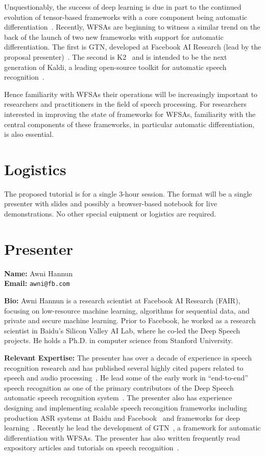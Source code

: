 \documentclass[11pt]{article}
\begin{document}
Unquestionably, the success of deep learning is due in part to the continued
evolution of tensor-based frameworks with a core component being automatic
differentiation~\cite{paszke2019pytorch, collobert2011torch7,
abadi2016tensorflow}. Recently, WFSAs are beginning to witness a similar trend
on the back of the launch of two new frameworks with support for automatic
differentiation. The first is GTN, developed at Facebook AI Research (lead by
the proposal presenter)~\cite{gtn}. The second is K2~\cite{k2} and is intended
to be the next generation of Kaldi, a leading open-source toolkit for automatic
speech recognition~\cite{povey2011kaldi}.

Hence familiarity with WFSAs their operations will be increasingly important to
researchers and practitioners in the field of speech processing. For
researchers interested in improving the state of frameworks for WFSAs,
familiarity with the central components of these frameworks, in particular
automatic differentiation, is also essential.

\section*{Logistics}

The proposed tutorial is for a single 3-hour session. The format will be a
single presenter with slides and possibly a browser-based notebook for live
demonstrations. No other special euipment or logistics are required.

\section*{Presenter}

{\bf Name:} Awni Hannun \\
{\bf Email:} \texttt{awni@fb.com}

{\bf Bio:} Awni Hannun is a research scientist at Facebook AI Research (FAIR),
focusing on low-resource machine learning, algorithms for sequential data, and
private and secure machine learning. Prior to Facebook, he worked as a research
scientist in Baidu's Silicon Valley AI Lab, where he co-led the Deep Speech
projects. He holds a Ph.D. in computer science from Stanford University.

{\bf Relevant Expertise:}
The presenter has over a decade of experience in speech recognition research
and has published several highly cited papers related to speech and audio
processing~\cite{hannun2014deep, maas2013, amodei2016deep}. He lead some of the
early work in ``end-to-end'' speech recognition as one of the primary
contributors of the Deep Speech automatic speech recognition
system~\cite{hannun2014deep}. The presenter also has experience designing and
implementing scalable speech recongition frameworks including production ASR
systems at Baidu and Facebook~\cite{amodei2016deep, w2lcode, pratap2019} and
frameworks for deep learning~\cite{flashlight}. Recently he lead the
development of GTN~\cite{gtn, hannun2020differentiable}, a framework for
automatic differentiation with WFSAs. The presenter has also written frequently
read expository articles and tutorials on speech
recognition~\cite{hannun2017sequence, awniblog}.
\end{document}
